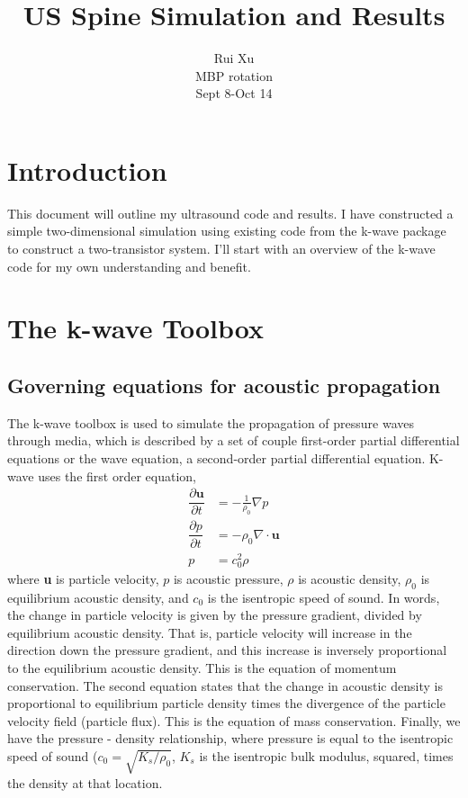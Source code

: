 \documentclass[10pt,a4paper]{article}
\title{US Spine Simulation and Results}
\author{Rui Xu \\ MBP rotation\\ Sept 8-Oct 14}
\begin{document}
\maketitle
 \newpage

\section{Introduction}

This document will outline my ultrasound code and results. I have constructed a simple two-dimensional simulation using existing code from the k-wave package to construct a two-transistor system. I'll start with an overview of the k-wave code for my own understanding and benefit. 

\section{The k-wave Toolbox}

\subsection{Governing equations for acoustic propagation}

The k-wave toolbox is used to simulate the propagation of pressure waves through media, which is described by a set of couple first-order partial differential equations or the wave equation, a second-order partial differential equation. K-wave uses the first order equation, 
\begin{align}
\dfrac{\partial \textbf{u}}{\partial t} &= - \frac{1}{\rho_0} \nabla p\\
\dfrac{\partial p }{\partial t} &= - \rho_0 \nabla \cdot \textbf{u}\\
p &= c_0^2 \rho
\end{align}
where \textbf{u} is particle velocity, $p$ is acoustic pressure, $\rho$ is acoustic density, $\rho_0$ is equilibrium acoustic density, and $c_0$ is the isentropic speed of sound. In words, the change in particle velocity is given by the pressure gradient, divided by equilibrium acoustic density. That is, particle velocity will increase in the direction down the pressure gradient, and this increase is inversely proportional to the equilibrium acoustic density. This is the equation of momentum conservation. The second equation states that the change in acoustic density is proportional to equilibrium particle density times the divergence of the particle velocity field (particle flux). This is the equation of mass conservation. Finally, we have the pressure - density relationship, where pressure is equal to the isentropic speed of sound ($c_0 = \sqrt{K_s/\rho_0}$, $K_s$ is the isentropic bulk modulus, squared, times the density at that location. 
\end{document}

